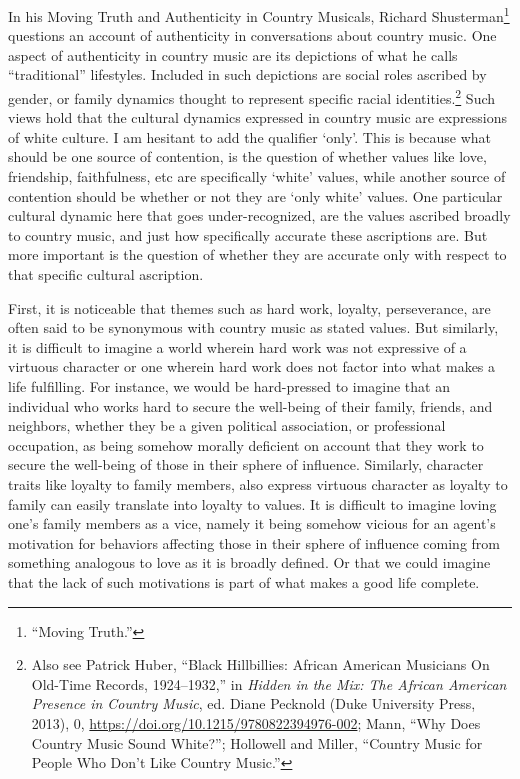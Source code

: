 \documentclass[phdthesis,12pt,final]{wuthesis}
\theoremstyle{definition}
\theoremstyle{definition}
\theoremstyle{definition}
\theoremstyle{definition}
\theoremstyle{remark}
\begin{document}
In his Moving Truth and Authenticity in Country Musicals, Richard Shusterman\footnote{{``Moving {Truth}.''}} questions an account of authenticity in conversations about country music. One aspect of authenticity in country music are its depictions of what he calls ``traditional'' lifestyles. Included in such depictions are social roles ascribed by gender, or family dynamics thought to represent specific racial identities.\footnote{Also see Patrick Huber, {``Black {Hillbillies}: {African American Musicians On Old-Time Records}, 1924--1932,''} in \emph{Hidden in the {Mix}: {The African American Presence} in {Country Music}}, ed. Diane Pecknold (Duke University Press, 2013), 0, \url{https://doi.org/10.1215/9780822394976-002}; Mann, {``Why Does Country Music Sound White?''}; Hollowell and Miller, {``Country {Music} for {People Who Don}'t {Like Country Music}.''}} Such views hold that the cultural dynamics expressed in country music are expressions of white culture. I am hesitant to add the qualifier `only'. This is because what should be one source of contention, is the question of whether values like love, friendship, faithfulness, etc are specifically `white' values, while another source of contention should be whether or not they are `only white' values. One particular cultural dynamic here that goes under-recognized, are the values ascribed broadly to country music, and just how specifically accurate these ascriptions are. But more important is the question of whether they are accurate only with respect to that specific cultural ascription.

First, it is noticeable that themes such as hard work, loyalty, perseverance, are often said to be synonymous with country music as stated values. But similarly, it is difficult to imagine a world wherein hard work was not expressive of a virtuous character or one wherein hard work does not factor into what makes a life fulfilling. For instance, we would be hard-pressed to imagine that an individual who works hard to secure the well-being of their family, friends, and neighbors, whether they be a given political association, or professional occupation, as being somehow morally deficient on account that they work to secure the well-being of those in their sphere of influence. Similarly, character traits like loyalty to family members, also express virtuous character as loyalty to family can easily translate into loyalty to values. It is difficult to imagine loving one's family members as a vice, namely it being somehow vicious for an agent's motivation for behaviors affecting those in their sphere of influence coming from something analogous to love as it is broadly defined. Or that we could imagine that the lack of such motivations is part of what makes a good life complete.
\end{document}
